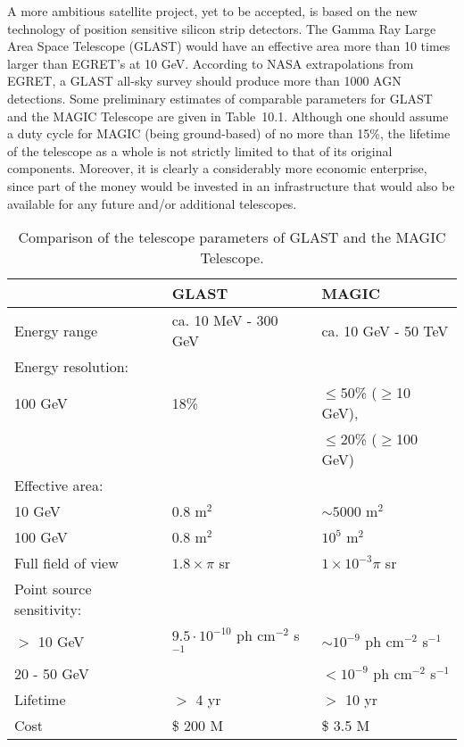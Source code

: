 A more ambitious satellite project, yet to be accepted, is based on the new
technology of position sensitive silicon strip detectors. The Gamma Ray
Large Area Space Telescope (GLAST) \cite{bloom:96}
would have an effective area more than 10
times larger than EGRET's at 10 GeV. According to NASA extrapolations from
EGRET, a GLAST all-sky survey should produce more than 1000 AGN detections.
Some preliminary estimates of comparable parameters for GLAST and 
the MAGIC Telescope are
given in Table~10.1. Although one should assume a duty cycle for
MAGIC (being ground-based) of no more than 15\%, the lifetime of the
telescope as a whole is not strictly limited to that of its original
components. Moreover, it is clearly a considerably more economic enterprise,
since part of the money would be invested in an infrastructure that would
also be available for any future and/or additional telescopes.

\begin{table}
\begin{center}
{\small
\begin{tabular}{|l|l|l|}
\hline
& GLAST  & MAGIC \\ \hline\hline
Energy range & ca. 10 MeV - 300 GeV & ca. 10 GeV - 50 TeV \\[0.8ex] 
Energy resolution: &  &  \\ 
100 GeV & 18\% & $\leq$50\% ($\geq$10 GeV),\\
& & $\leq$20\% ($\geq$100 GeV)\\[0.8ex] 
Effective area: &  &  \\ 
10 GeV & 0.8 m$^{2}$ & $\sim 5000$ m$^{2}$ \\ 
100 GeV & 0.8 m$^{2}$ & $10^{5}$ m$^{2}$ \\[0.8ex] 
Full field of view & $1.8\times \pi $ sr & $1\times 10^{-3}\pi $ sr \\[0.8ex] 
Point source sensitivity\footnotemark : &  &  \\ 
$>$ 10 GeV & $9.5\cdot 10^{-10}$ ph cm$^{-2}$ s$^{-1}$ & $\sim 
10^{-9}$ ph cm$^{-2}$ s$^{-1}$ \\ 
20 - 50 GeV &  & $<10^{-9}$ ph cm$^{-2}$ s$^{-1}$ \\[0.8ex] 
Lifetime & $>$ 4 yr & $>$ 10 yr \\[0.8ex] 
Cost & \$ 200 M & \$ 3.5 M \\ \hline
\end{tabular}
}
\end{center}
\caption{Comparison of the telescope parameters of GLAST and 
the MAGIC Telescope.}
\end{table}

